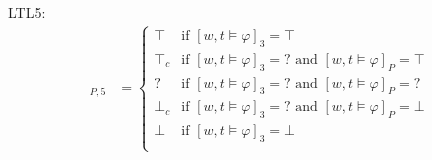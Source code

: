 \documentclass[envcountsame, runningheads]{llncs}
\newcommand{\?}{\text{?}}
\begin{document}
	LTL5:
	\begin{align*}
		[w,t \models \varphi]_{P,5} &= \begin{cases}
			\top &\text{if } [w,t \models \varphi]_3 = \top \\
			\top_c &\text{if } [w,t \models \varphi]_3 = \? \text{ and } [w,t \models \varphi]_P = \top \\
			? &\text{if } [w,t \models \varphi]_3 = \? \text{ and } [w,t \models \varphi]_P = \? \\
			\bot_c &\text{if } [w,t \models \varphi]_3 = \? \text{ and } [w,t \models \varphi]_P = \bot \\
			\bot &\text{if } [w,t \models \varphi]_3 = \bot \\
		\end{cases} \\
	\end{align*}	
	
	\newpage
	
	
\end{document}
